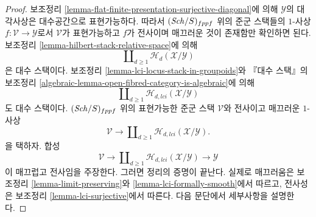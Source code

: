 \begin{proof}
보조정리 \ref{lemma-flat-finite-presentation-surjective-diagonal}에 의해
$\mathcal{Y}$의 대각사상은 대수공간으로 표현가능하다. 따라서
$(\mathit{Sch}/S)_{fppf}$ 위의 준군 스택들의 $1$-사상
$f : \mathcal{V} \to \mathcal{Y}$로서 $\mathcal{V}$가 표현가능하고
$f$가 전사이며 매끄러운 것이 존재함만 확인하면 된다. 보조정리
\ref{lemma-hilbert-stack-relative-space}에 의해
$$
\coprod\nolimits_{d \geq 1} \mathcal{H}_d(\mathcal{X}/\mathcal{Y})
$$
은 대수 스택이다. 보조정리
\ref{lemma-lci-locus-stack-in-groupoids}와 『대수 스택』의 보조정리
\ref{algebraic-lemma-open-fibred-category-is-algebraic}에 의해
$$
\coprod\nolimits_{d \geq 1} \mathcal{H}_{d, lci}(\mathcal{X}/\mathcal{Y})
$$
도 대수 스택이다. $(\mathit{Sch}/S)_{fppf}$ 위의 표현가능한 준군 스택
$\mathcal{V}$와 전사이고 매끄러운 $1$-사상
$$
\mathcal{V}
\longrightarrow
\coprod\nolimits_{d \geq 1} \mathcal{H}_{d, lci}(\mathcal{X}/\mathcal{Y}).
$$
을 택하자. 합성
$$
\mathcal{V}
\longrightarrow
\coprod\nolimits_{d \geq 1} \mathcal{H}_{d, lci}(\mathcal{X}/\mathcal{Y})
\longrightarrow
\mathcal{Y}
$$
이 매끄럽고 전사임을 주장한다. 그러면 정리의 증명이 끝난다. 실제로
매끄러움은 보조정리 \ref{lemma-limit-preserving}와
\ref{lemma-lci-formally-smooth}에서 따르고, 전사성은 보조정리
\ref{lemma-lci-surjective}에서 따른다. 다음 문단에서 세부사항을 설명한다.


\end{proof}
